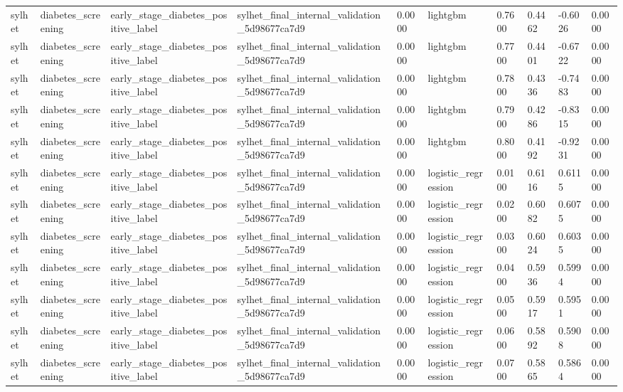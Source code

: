 \begin{tabular}{llllllllll}
sylhet & diabetes\_screening & early\_stage\_diabetes\_positive\_label & sylhet\_final\_internal\_validation\_5d98677ca7d9 & 0.0000 & lightgbm & 0.7600 & 0.4462 & -0.6026 & 0.0000 \\
sylhet & diabetes\_screening & early\_stage\_diabetes\_positive\_label & sylhet\_final\_internal\_validation\_5d98677ca7d9 & 0.0000 & lightgbm & 0.7700 & 0.4401 & -0.6722 & 0.0000 \\
sylhet & diabetes\_screening & early\_stage\_diabetes\_positive\_label & sylhet\_final\_internal\_validation\_5d98677ca7d9 & 0.0000 & lightgbm & 0.7800 & 0.4336 & -0.7483 & 0.0000 \\
sylhet & diabetes\_screening & early\_stage\_diabetes\_positive\_label & sylhet\_final\_internal\_validation\_5d98677ca7d9 & 0.0000 & lightgbm & 0.7900 & 0.4286 & -0.8315 & 0.0000 \\
sylhet & diabetes\_screening & early\_stage\_diabetes\_positive\_label & sylhet\_final\_internal\_validation\_5d98677ca7d9 & 0.0000 & lightgbm & 0.8000 & 0.4192 & -0.9231 & 0.0000 \\
sylhet & diabetes\_screening & early\_stage\_diabetes\_positive\_label & sylhet\_final\_internal\_validation\_5d98677ca7d9 & 0.0000 & logistic\_regression & 0.0100 & 0.6116 & 0.6115 & 0.0000 \\
sylhet & diabetes\_screening & early\_stage\_diabetes\_positive\_label & sylhet\_final\_internal\_validation\_5d98677ca7d9 & 0.0000 & logistic\_regression & 0.0200 & 0.6082 & 0.6075 & 0.0000 \\
sylhet & diabetes\_screening & early\_stage\_diabetes\_positive\_label & sylhet\_final\_internal\_validation\_5d98677ca7d9 & 0.0000 & logistic\_regression & 0.0300 & 0.6024 & 0.6035 & 0.0000 \\
sylhet & diabetes\_screening & early\_stage\_diabetes\_positive\_label & sylhet\_final\_internal\_validation\_5d98677ca7d9 & 0.0000 & logistic\_regression & 0.0400 & 0.5936 & 0.5994 & 0.0000 \\
sylhet & diabetes\_screening & early\_stage\_diabetes\_positive\_label & sylhet\_final\_internal\_validation\_5d98677ca7d9 & 0.0000 & logistic\_regression & 0.0500 & 0.5917 & 0.5951 & 0.0000 \\
sylhet & diabetes\_screening & early\_stage\_diabetes\_positive\_label & sylhet\_final\_internal\_validation\_5d98677ca7d9 & 0.0000 & logistic\_regression & 0.0600 & 0.5892 & 0.5908 & 0.0000 \\
sylhet & diabetes\_screening & early\_stage\_diabetes\_positive\_label & sylhet\_final\_internal\_validation\_5d98677ca7d9 & 0.0000 & logistic\_regression & 0.0700 & 0.5865 & 0.5864 & 0.0000 \\

\end{tabular}
